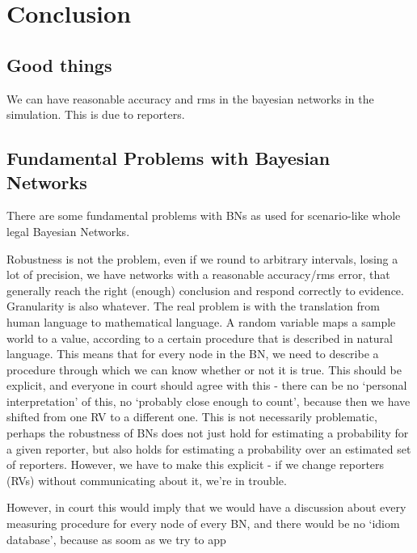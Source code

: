  

\chapter[Conclusion]{Conclusion}


\section{Good things}

We can have reasonable accuracy and rms in the bayesian networks in the simulation. This is due to reporters.


\section{Fundamental Problems with Bayesian Networks}

There are some fundamental problems with BNs as used for scenario-like whole legal Bayesian Networks.

Robustness is not the problem, even if we round to arbitrary intervals, losing a lot of precision, we have networks with a reasonable accuracy/rms error, that generally reach the right (enough) conclusion and respond correctly to evidence. Granularity is also whatever. The real problem is with the translation from human language to mathematical language. A random variable maps a sample world to a value, according to a certain procedure that is described in natural language. This means that for every node in the BN, we need to describe a procedure through which we can know whether or not it is true. This should be explicit, and everyone in court should agree with this - there can be no `personal interpretation' of this, no `probably close enough to count', because then we have shifted from one RV to a different one. This is not necessarily problematic, perhaps the robustness of BNs does not just hold for estimating a probability for a given reporter, but also holds for estimating a probability over an estimated set of reporters. However, we have to make this explicit - if we change reporters (RVs) without communicating about it, we're in trouble. 

However, in court this would imply that we would have a discussion about every measuring procedure for every node of every BN, and there would be no `idiom database', because as soom as we try to app
